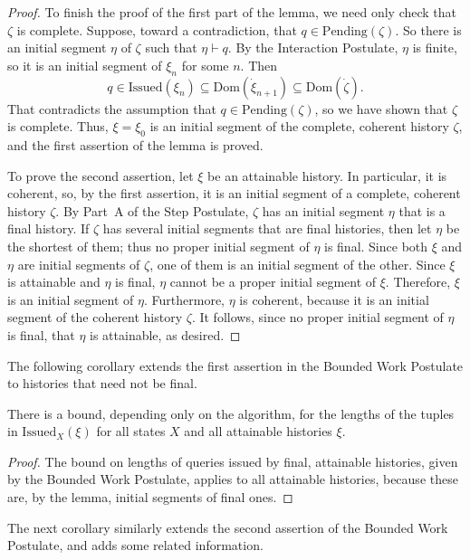 \documentclass{LMCS}
\theoremstyle{definition}
\newcommand{\ans}{\dot}
\newcommand{\dom}[1]{\ensuremath{{\text{Dom}}(#1)}}
\newcommand{\Issued}{\text{Issued}}
\begin{document}
\begin{proof}
To finish the proof of the first part of the lemma, we need only check
that $\zeta$ is complete.  Suppose, toward a contradiction, that
$q\in\text{Pending}(\zeta)$.  So there is an initial segment $\eta$ of
$\zeta$ such that $\eta\vdash q$.  By the Interaction Postulate,
$\eta$ is finite, so it is an initial segment of $\xi_n$ for some $n$.
Then
$$
q\in\Issued(\xi_n)\subseteq \dom{\ans\xi_{n+1}}\subseteq\dom{\ans\zeta}.
$$
That contradicts the assumption that $q\in\text{Pending}(\zeta)$, so
we have shown that $\zeta$ is complete.  Thus, $\xi=\xi_0$ is an
initial segment of the complete, coherent history $\zeta$, and the
first assertion of the lemma is proved.

To prove the second assertion, let $\xi$ be an attainable history.  In
particular, it is coherent, so, by the first assertion, it is an
initial segment of a complete, coherent history $\zeta$.  By Part~A of
the Step Postulate, $\zeta$ has an initial segment $\eta$ that is a
final history.  If $\zeta$ has several initial segments that are final
histories, then let $\eta$ be the shortest of them; thus no proper
initial segment of $\eta$ is final.  Since both $\xi$ and $\eta$ are
initial segments of $\zeta$, one of them is an initial segment of the
other.  Since $\xi$ is attainable and $\eta$ is final, $\eta$ cannot
be a proper initial segment of $\xi$.  Therefore, $\xi$ is an initial
segment of $\eta$.  Furthermore, $\eta$ is coherent, because it is an
initial segment of the coherent history $\zeta$.  It follows, since no
proper initial segment of $\eta$ is final, that $\eta$ is attainable,
as desired.
\end{proof}

The following corollary extends the first assertion in the Bounded
Work Postulate to histories that need not be final.

\begin{cor}  \label{bd-query}
  There is a bound, depending only on the algorithm, for the lengths
    of the tuples in $\Issued_X(\xi)$ for all states $X$ and all
    attainable histories $\xi$.
\end{cor}

\begin{proof}
  The bound on lengths of queries issued by final, attainable
  histories, given by the Bounded Work Postulate, applies to all
  attainable histories, because these are, by the lemma, initial
  segments of final ones.
\end{proof}

The next corollary similarly extends the second assertion of the
Bounded Work Postulate, and adds some related information.
\end{document}
